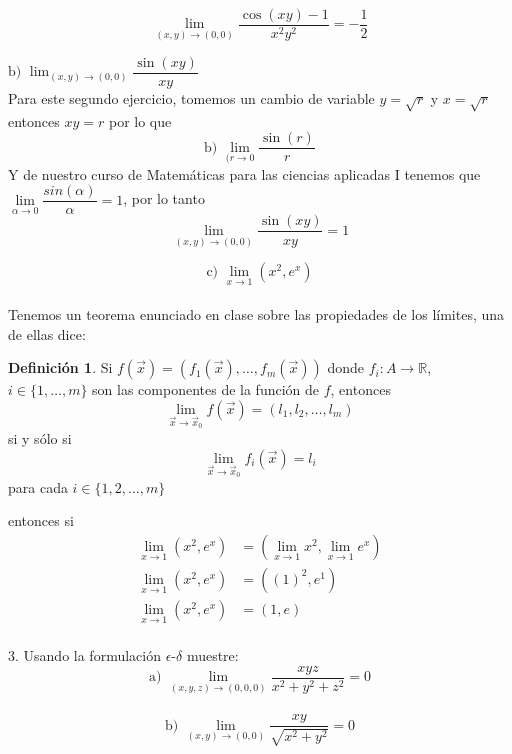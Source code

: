 \documentclass[letterpaper]{article}
\newcommand{\R}{\mathds{R}}
\renewcommand{\*}{\cdot}
\theoremstyle{definition}
\newtheorem{definition}{Definición}
\begin{document}
$$\displaystyle\lim_{(x,y) \to (0,0)} \dfrac{\cos(xy) - 1}{x^2y^2} = -\dfrac{1}{2}$$

\noindent$\text{b) }\displaystyle\lim_{(x,y) \to (0,0)} \dfrac{\sin(xy) }{xy}$\\
Para este segundo ejercicio, tomemos un cambio de variable $ y =\sqrt{r}  $ y $ x = \sqrt{r} $ entonces $ xy = r $ por lo que
$$\text{b) }\displaystyle\lim_{(r\to 0} \dfrac{\sin(r) }{r}$$
Y de nuestro curso de Matemáticas para las ciencias aplicadas I tenemos que $ \lim\limits_{\alpha \to 0} \dfrac{sin(\alpha)}{\alpha} = 1 $, por lo tanto
$$\displaystyle\lim_{(x,y) \to (0,0)} \dfrac{\sin(xy) }{xy} = 1$$

$$\text{c) }\displaystyle\lim_{x \to 1} (x^2 , e^x) $$\\[0.5cm]
Tenemos un teorema enunciado en clase sobre las propiedades de los límites, una de ellas dice:
\begin{definition}
	Si $ f(\vec{x}) = (f_1(\vec{x}), \dots, f_m(\vec{x})) $ donde $ f_i:A \to \R  $, $ i \in \{ 1, \dots, m \} $  son las componentes de la función de $ f $, entonces 
	\[ \lim\limits_{\vec{x} \to \vec{x}_0 } f(\vec{x}) = (l_1, l_2, \dots, l_m) \] si y sólo si\[ \lim\limits_{\vec{x} \to \vec{x}_0} f_i(\vec{x}) = l_i \] para cada $ i \in \{ 1, 2, \dots, m \} $
\end{definition}
entonces si
\begin{align*}
	\lim_{x \to 1} (x^2 , e^x) &=\left( \lim_{x \to 1} x^2, \lim_{x \to 1} e^x \right)\\
	\lim_{x \to 1} (x^2 , e^x) &=\left( (1)^2,  e^{1} \right)\\
	\lim_{x \to 1} (x^2 , e^x) &=\left( 1,  e \right)\\
\end{align*}

3.  Usando la formulación $\epsilon$-$\delta$ muestre: \\

 $$ \text{a) } \displaystyle\lim_{(x,y,z) \to (0,0,0)} \dfrac{xyz}{x^2 + y^2 + z^2} = 0$$\\

$$\text{b) }\displaystyle\lim_{(x,y) \to (0,0)} \dfrac{xy }{\sqrt{x^2 + y^2}} = 0$$\\
\end{document}
